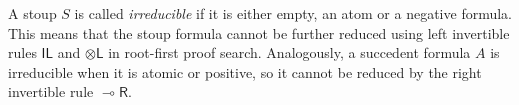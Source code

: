 \documentclass[runningheads]{llncs}
\newcommand{\tl}{\otimes \mathsf{L}}
\newcommand{\tr}{\otimes \mathsf{R}}
\newcommand{\lright}{{\multimap}\mathsf{R}}
\newcommand{\lleft}{{\multimap}\mathsf{L}}
\newcommand{\pass}{\mathsf{pass}}
\newcommand{\unitl}{\mathsf{IL}}
\newcommand{\otL}{\tl}
\newcommand{\lolliR}{\lright}
\newcommand{\IL}{\unitl}
\newcommand{\ot}{\otimes}
\newcommand{\lolli}{\multimap}
\newcommand{\illol}{\rotatebox[origin=c]{180}{$\multimap$}}
\newcommand{\I}{\mathsf{I}}
\newcommand{\NMILL}{\texttt{NMILL}}
\newcommand{\SkNMILL}{\texttt{SkNMILL}}
\begin{document}
A stoup $S$ is called \emph{irreducible} if it is either empty, an atom or a negative formula. This means that the stoup formula cannot be further reduced using left invertible rules $\IL$ and $\otL$ in root-first proof search. Analogously, a succedent formula $A$ is irreducible when it is atomic or positive, so it cannot be reduced by the right invertible rule $\lolliR$.


\end{document}
